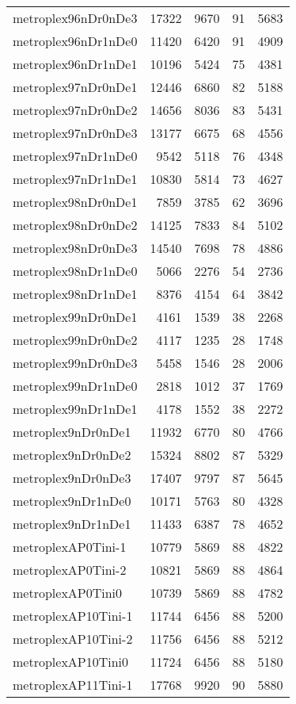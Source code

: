 \documentclass[../../../thesis.tex]{subfiles}
\begin{document}
\begin{longtable}{lrrrr}
metroplex96nDr0nDe3 & 17322 & 9670 & 91 & 5683 \\
metroplex96nDr1nDe0 & 11420 & 6420 & 91 & 4909 \\
metroplex96nDr1nDe1 & 10196 & 5424 & 75 & 4381 \\
metroplex97nDr0nDe1 & 12446 & 6860 & 82 & 5188 \\
metroplex97nDr0nDe2 & 14656 & 8036 & 83 & 5431 \\
metroplex97nDr0nDe3 & 13177 & 6675 & 68 & 4556 \\
metroplex97nDr1nDe0 & 9542 & 5118 & 76 & 4348 \\
metroplex97nDr1nDe1 & 10830 & 5814 & 73 & 4627 \\
metroplex98nDr0nDe1 & 7859 & 3785 & 62 & 3696 \\
metroplex98nDr0nDe2 & 14125 & 7833 & 84 & 5102 \\
metroplex98nDr0nDe3 & 14540 & 7698 & 78 & 4886 \\
metroplex98nDr1nDe0 & 5066 & 2276 & 54 & 2736 \\
metroplex98nDr1nDe1 & 8376 & 4154 & 64 & 3842 \\
metroplex99nDr0nDe1 & 4161 & 1539 & 38 & 2268 \\
metroplex99nDr0nDe2 & 4117 & 1235 & 28 & 1748 \\
metroplex99nDr0nDe3 & 5458 & 1546 & 28 & 2006 \\
metroplex99nDr1nDe0 & 2818 & 1012 & 37 & 1769 \\
metroplex99nDr1nDe1 & 4178 & 1552 & 38 & 2272 \\
metroplex9nDr0nDe1 & 11932 & 6770 & 80 & 4766 \\
metroplex9nDr0nDe2 & 15324 & 8802 & 87 & 5329 \\
metroplex9nDr0nDe3 & 17407 & 9797 & 87 & 5645 \\
metroplex9nDr1nDe0 & 10171 & 5763 & 80 & 4328 \\
metroplex9nDr1nDe1 & 11433 & 6387 & 78 & 4652 \\
metroplexAP0Tini-1 & 10779 & 5869 & 88 & 4822 \\
metroplexAP0Tini-2 & 10821 & 5869 & 88 & 4864 \\
metroplexAP0Tini0 & 10739 & 5869 & 88 & 4782 \\
metroplexAP10Tini-1 & 11744 & 6456 & 88 & 5200 \\
metroplexAP10Tini-2 & 11756 & 6456 & 88 & 5212 \\
metroplexAP10Tini0 & 11724 & 6456 & 88 & 5180 \\
metroplexAP11Tini-1 & 17768 & 9920 & 90 & 5880 \\

\end{longtable}
\end{document}
